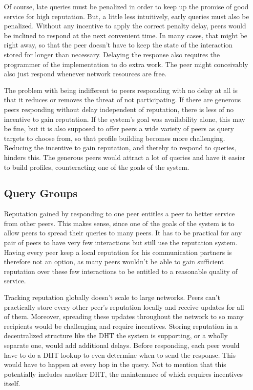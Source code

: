 Of course, late queries must be penalized in order to keep up the promise
of good service for high reputation. But, a little less intuitively, early
queries must also be penalized. Without any incentive to apply the correct
penalty delay, peers would be inclined to respond at the next convenient time.
In many cases, that might be right away, so that the peer doesn't have to keep
the state of the interaction stored for longer than necessary. Delaying the
response also requires the programmer of the implementation to do extra work.
The peer might conceivably also just respond whenever network resources are
free.

The problem with being indifferent to peers responding with no delay at all is
that it reduces or removes the threat of not participating. If there are
generous peers responding without delay independent of reputation, there is less
of no incentive to gain reputation. If the system's goal was availability alone,
this may be fine, but it is also supposed to offer peers a wide variety of peers
as query targets to choose from, so that profile building becomes more
challenging. Reducing the incentive to gain reputation, and thereby to respond
to queries, hinders this. The generous peers would attract a lot of queries and
have it easier to build profiles, counteracting one of the goals of the system.

\subsection{Query Groups}
Reputation gained by responding to one peer entitles a peer to better service
from other peers. This makes sense, since one of the goals of the system is to
allow peers to spread their queries to many peers. It has to be practical for
any pair of peers to have very few interactions but still use the reputation
system. Having every peer keep a local reputation for his communication partners
is therefore not an option, as many peers wouldn't be able to gain sufficient
reputation over these few interactions to be entitled to a reasonable quality of
service.

Tracking reputation globally doesn't scale to large networks. Peers can't
practically store every other peer's reputation locally and receive updates for
all of them. Moreover, spreading these updates throughout the network to so many
recipients would be challenging and require incentives. Storing reputation in a
decentralized structure like the \ac{DHT} the system is supporting, or a wholly
separate one, would add additional delays. Before responding, each peer would
have to do a \ac{DHT} lookup to even determine when to send the response. This
would have to happen at every hop in the query. Not to mention that this
potentially includes another \ac{DHT}, the maintenance of which requires
incentives itself.

